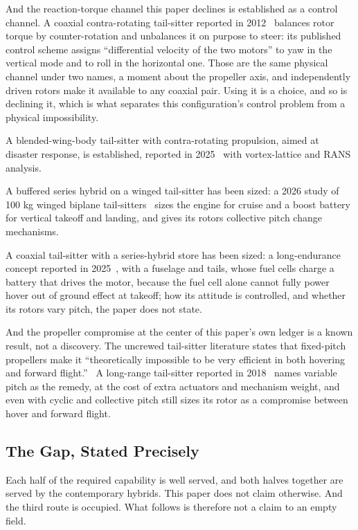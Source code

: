 \documentclass[journal]{new-aiaa}
\begin{document}
And the reaction-torque channel this paper declines is established as a control channel. A coaxial contra-rotating tail-sitter reported in 2012~\cite{r8} balances rotor torque by counter-rotation and unbalances it on purpose to steer: its published control scheme assigns ``differential velocity of the two motors'' to yaw in the vertical mode and to roll in the horizontal one. Those are the same physical channel under two names, a moment about the propeller axis, and independently driven rotors make it available to any coaxial pair. Using it is a choice, and so is declining it, which is what separates this configuration's control problem from a physical impossibility.

A blended-wing-body tail-sitter with contra-rotating propulsion, aimed at disaster response, is established, reported in 2025~\cite{r9} with vortex-lattice and RANS analysis.

A buffered series hybrid on a winged tail-sitter has been sized: a 2026 study of 100 kg winged biplane tail-sitters~\cite{r10} sizes the engine for cruise and a boost battery for vertical takeoff and landing, and gives its rotors collective pitch change mechanisms.

A coaxial tail-sitter with a series-hybrid store has been sized: a long-endurance concept reported in 2025~\cite{r11}, with a fuselage and tails, whose fuel cells charge a battery that drives the motor, because the fuel cell alone cannot fully power hover out of ground effect at takeoff; how its attitude is controlled, and whether its rotors vary pitch, the paper does not state.

And the propeller compromise at the center of this paper's own ledger is a known result, not a discovery. The uncrewed tail-sitter literature states that fixed-pitch propellers make it ``theoretically impossible to be very efficient in both hovering and forward flight.''~\cite{r2} A long-range tail-sitter reported in 2018~\cite{r2} names variable pitch as the remedy, at the cost of extra actuators and mechanism weight, and even with cyclic and collective pitch still sizes its rotor as a compromise between hover and forward flight.

\subsection{The Gap, Stated Precisely}

Each half of the required capability is well served, and both halves together are served by the contemporary hybrids. This paper does not claim otherwise. And the third route is occupied. What follows is therefore not a claim to an empty field.
\end{document}

